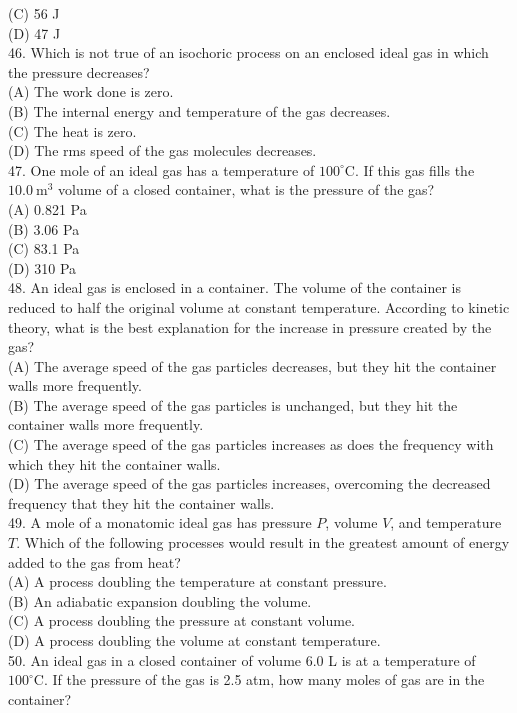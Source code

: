 \begin{enumerate}
(C) 56 J\\
(D) 47 J\\
46. Which is not true of an isochoric process on an enclosed ideal gas in which the pressure decreases?\\
(A) The work done is zero.\\
(B) The internal energy and temperature of the gas decreases.\\
(C) The heat is zero.\\
(D) The rms speed of the gas molecules decreases.\\
47. One mole of an ideal gas has a temperature of $100^{\circ} \mathrm{C}$. If this gas fills the $10.0 \mathrm{~m}^{3}$ volume of a closed container, what is the pressure of the gas?\\
(A) 0.821 Pa\\
(B) 3.06 Pa\\
(C) 83.1 Pa\\
(D) 310 Pa\\
48. An ideal gas is enclosed in a container. The volume of the container is reduced to half the original volume at constant temperature. According to kinetic theory, what is the best explanation for the increase in pressure created by the gas?\\
(A) The average speed of the gas particles decreases, but they hit the container walls more frequently.\\
(B) The average speed of the gas particles is unchanged, but they hit the container walls more frequently.\\
(C) The average speed of the gas particles increases as does the frequency with which they hit the container walls.\\
(D) The average speed of the gas particles increases, overcoming the decreased frequency that they hit the container walls.\\
49. A mole of a monatomic ideal gas has pressure $P$, volume $V$, and temperature $T$. Which of the following processes would result in the greatest amount of energy added to the gas from heat?\\
(A) A process doubling the temperature at constant pressure.\\
(B) An adiabatic expansion doubling the volume.\\
(C) A process doubling the pressure at constant volume.\\
(D) A process doubling the volume at constant temperature.\\
50. An ideal gas in a closed container of volume 6.0 L is at a temperature of $100^{\circ} \mathrm{C}$. If the pressure of the gas is 2.5 atm, how many moles of gas are in the container?\\

\end{enumerate}
